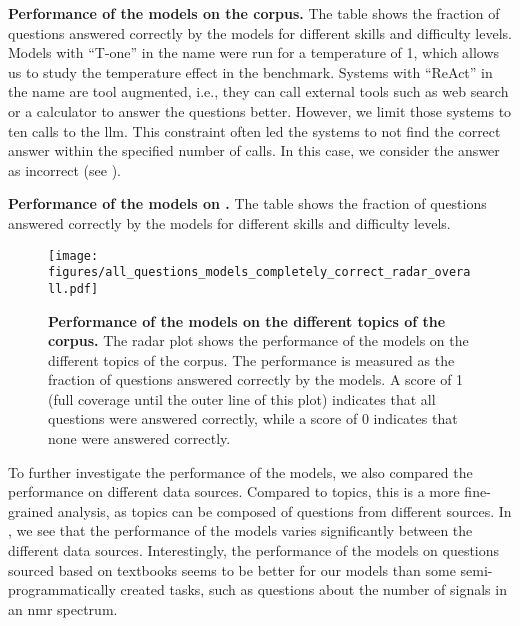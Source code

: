 \begin{table}
    \caption{\textbf{Performance of the models on the \chembench corpus.} The table shows the fraction of questions answered correctly by the models for different skills and difficulty levels. Models with \enquote{T-one} in the name were run for a temperature of 1, which allows us to study the temperature effect in the benchmark. Systems with \enquote{ReAct} in the name are tool augmented, i.e., they can call external tools such as web search or a calculator to answer the questions better. However, we limit those systems to ten calls to the \gls{llm}. This constraint often led the systems to not find the correct answer within the specified number of calls. In this case, we consider the answer as incorrect (see ).}
    \label{tab:performance_table}
\end{table}

\begin{table}
    \caption{\textbf{Performance of the models on \chembenchmini.} The table shows the fraction of questions answered correctly by the models for different skills and difficulty levels.}
    \label{tab:performance_table_human_subset}
\end{table}

\begin{figure}[htb]
    \centering
    \texttt{[image: figures/all\_questions\_models\_completely\_correct\_radar\_overall.pdf]}
    \caption{\textbf{Performance of the models on the different topics of the \chembench corpus.} The radar plot shows the performance of the models on the different topics of the \chembench corpus. The performance is measured as the fraction of questions answered correctly by the models.
    A score of 1 (full coverage until the outer line of this plot) indicates that all questions were answered correctly, while a score of 0 indicates that none were answered correctly.
    }
    \label{fig:all_questions_models_completely_correct_radar_overall}
\end{figure}




To further investigate the performance of the models, we also compared the performance on different data sources.
Compared to topics, this is a more fine-grained analysis, as topics can be composed of questions from different sources.
In , we see that the performance of the models varies significantly between the different data sources.
Interestingly, the performance of the models on questions sourced based on textbooks seems to be better for our models than some semi-programmatically created tasks, such as questions about the number of signals in an \gls{nmr} spectrum.


